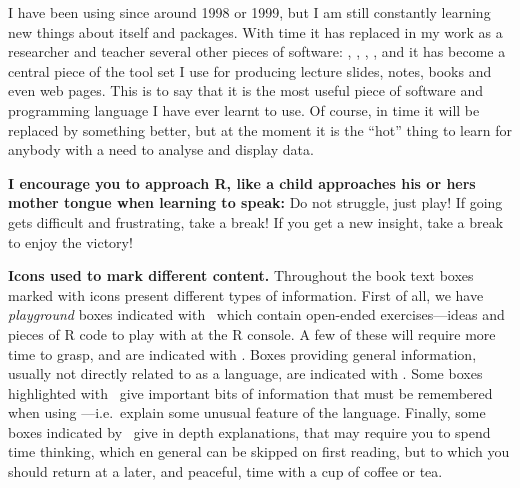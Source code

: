 I have been using \Rpgrm since around 1998 or 1999, but I am still constantly learning new things about \Rpgrm itself and \Rpgrm packages. With time it has replaced in my work as a researcher and teacher several other pieces of software: , , , , and it has become a central piece of the tool set I use for producing lecture slides, notes, books and even web pages. This is to say that it is the most useful piece of software and programming language I have ever learnt to use. Of course, in time it will be replaced by something better, but at the moment it is the ``hot'' thing to learn for anybody with a need to analyse and display data.

\begin{framed}
\noindent\large%
\textbf{I encourage you to approach R, like a child approaches his or hers mother tongue when learning to speak:} Do not struggle, just play! If going gets difficult and frustrating, take a break! If you get a new insight, take a break to enjoy the victory!
\end{framed}

\newpage

\begin{framed}
\noindent\large
\textbf{Icons used to mark different content.} Throughout the book text boxes marked with icons present different types of information. First of all, we have \emph{playground} boxes indicated with \playicon\ which contain open-ended exercises---ideas and pieces of R code to play with at the R console. A few of these will require more time to grasp, and are indicated with \advplayicon. Boxes providing general information, usually not directly related to  as a language, are indicated with \infoicon. Some boxes highlighted with \ilAttention\ give important bits of information that must be remembered when using ---i.e.\ explain some unusual feature of the language. Finally, some boxes indicated by \ilAdvanced\ give in depth explanations, that may require you to spend time thinking, which en general can be skipped on first reading, but to which you should return at a later, and peaceful, time with a cup of coffee or tea.
\end{framed}
\newpage

